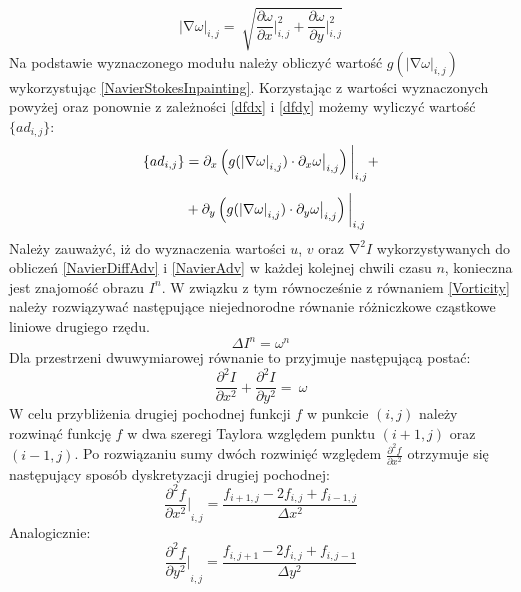 \documentclass[12pt, twoside, openany]{report}
\theoremstyle{definition}
\begin{document}
\begin{equation}
{\left|\mathrm{\nabla }\omega \right|}_{i,j}=\ \sqrt{\frac{\partial \omega }{\partial x}\bigg|^2_{i,j}+\frac{\partial \omega }{\partial y}\bigg|^2_{i,j}}
\label{magnitudedw}
\end{equation}
Na podstawie wyznaczonego modułu należy obliczyć wartość $g{\left({\left|\mathrm{\nabla }\omega \right|}_{i,j}\right)}$ wykorzystując \eqref{NavierStokesInpainting}. Korzystając z wartości wyznaczonych powyżej oraz ponownie z zależności \eqref{dfdx} i \eqref{dfdy} możemy wyliczyć wartość $\{ad_{i,j}\} $:
\begin{align}
\{ad_{i,j}\} &= \partial_x \left( g(\left| \nabla\omega \right|_{i,j}) \cdot \partial_x \omega \big|_{i,j} \right) \bigg|_{i,j} \notag +\\[1ex]
&+ \partial_y \left( g(\left|\nabla\omega\right|_{i,j}) \cdot \partial_y \omega \big|_{i,j} \right)\bigg|_{i,j}
\label{discreteAnisotropic}
\end{align}
Należy zauważyć, iż do wyznaczenia wartości $u$, $v$ oraz ${\mathrm{\nabla }}^2I$ wykorzystywanych do obliczeń \eqref{NavierDiffAdv} i \eqref{NavierAdv} w każdej kolejnej chwili czasu $n$, konieczna jest znajomość obrazu $I^n$. W związku z tym równocześnie z równaniem \eqref{Vorticity} należy rozwiązywać następujące niejednorodne równanie różniczkowe cząstkowe liniowe drugiego rzędu.
\begin{equation}
\Delta I^n={\omega }^n
\label{Poisson}
\end{equation}
Dla przestrzeni dwuwymiarowej równanie to przyjmuje następującą postać:
\begin{equation}
\frac{{\partial }^2I}{\partial x^2}+\frac{{\partial }^2I}{\partial y^2}=\ \omega
\label{Poisson2D}
\end{equation}
W celu przybliżenia drugiej pochodnej funkcji $f$ w punkcie $(i,j)$ należy rozwinąć funkcję $f$ w dwa szeregi Taylora względem punktu $(i+1,j)$ oraz $(i-1,j)$. Po rozwiązaniu sumy dwóch rozwinięć względem $\frac{{\partial }^2f}{\partial x^2}$ otrzymuje się następujący sposób dyskretyzacji drugiej pochodnej:
\begin{equation}
{\frac{{\partial }^2f}{\partial x^2}\bigg|}_{i,j}\mathrm{=}\frac{f_{i+1,j}-2f_{i,j}+f_{i-1,j}}{\Delta x^2}
\label{d2fdx2}
\end{equation}
Analogicznie:
\begin{equation}
{\frac{{\partial }^2f}{\partial y^2}\bigg|}_{i,j}\mathrm{=}\frac{f_{i,j+1}-2f_{i,j}+f_{i,j-1}}{\Delta y^2}
\label{d2fdy2}
\end{equation}
\end{document}
